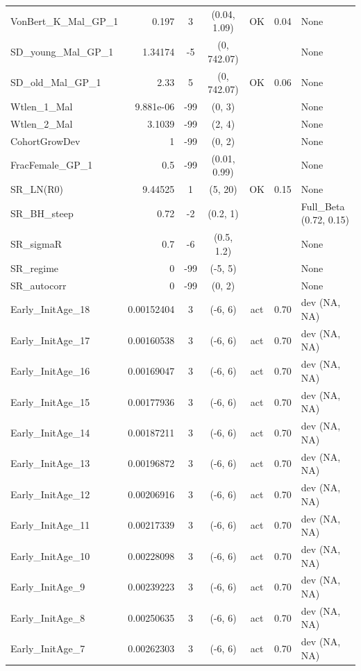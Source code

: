 \documentclass[12pt,]{article}
\begin{document}
\begin{landscape}
\begin{longtable}{lrcccll}
  VonBert\_K\_Mal\_GP\_1 & 0.197 & 3 & (0.04, 1.09) & OK & 0.04 & None \\ 
  SD\_young\_Mal\_GP\_1 & 1.34174 & -5 & (0, 742.07) &  &  & None \\ 
  SD\_old\_Mal\_GP\_1 & 2.33 & 5 & (0, 742.07) & OK & 0.06 & None \\ 
  Wtlen\_1\_Mal & 9.881e-06 & -99 & (0, 3) &  &  & None \\ 
  Wtlen\_2\_Mal & 3.1039 & -99 & (2, 4) &  &  & None \\ 
  CohortGrowDev & 1 & -99 & (0, 2) &  &  & None \\ 
  FracFemale\_GP\_1 & 0.5 & -99 & (0.01, 0.99) &  &  & None \\ 
  SR\_LN(R0) & 9.44525 & 1 & (5, 20) & OK & 0.15 & None \\ 
  SR\_BH\_steep & 0.72 & -2 & (0.2, 1) &  &  & Full\_Beta (0.72, 0.15) \\ 
  SR\_sigmaR & 0.7 & -6 & (0.5, 1.2) &  &  & None \\ 
  SR\_regime & 0 & -99 & (-5, 5) &  &  & None \\ 
  SR\_autocorr & 0 & -99 & (0, 2) &  &  & None \\ 
  Early\_InitAge\_18 & 0.00152404 & 3 & (-6, 6) & act & 0.70 & dev (NA, NA) \\ 
  Early\_InitAge\_17 & 0.00160538 & 3 & (-6, 6) & act & 0.70 & dev (NA, NA) \\ 
  Early\_InitAge\_16 & 0.00169047 & 3 & (-6, 6) & act & 0.70 & dev (NA, NA) \\ 
  Early\_InitAge\_15 & 0.00177936 & 3 & (-6, 6) & act & 0.70 & dev (NA, NA) \\ 
  Early\_InitAge\_14 & 0.00187211 & 3 & (-6, 6) & act & 0.70 & dev (NA, NA) \\ 
  Early\_InitAge\_13 & 0.00196872 & 3 & (-6, 6) & act & 0.70 & dev (NA, NA) \\ 
  Early\_InitAge\_12 & 0.00206916 & 3 & (-6, 6) & act & 0.70 & dev (NA, NA) \\ 
  Early\_InitAge\_11 & 0.00217339 & 3 & (-6, 6) & act & 0.70 & dev (NA, NA) \\ 
  Early\_InitAge\_10 & 0.00228098 & 3 & (-6, 6) & act & 0.70 & dev (NA, NA) \\ 
  Early\_InitAge\_9 & 0.00239223 & 3 & (-6, 6) & act & 0.70 & dev (NA, NA) \\ 
  Early\_InitAge\_8 & 0.00250635 & 3 & (-6, 6) & act & 0.70 & dev (NA, NA) \\ 
  Early\_InitAge\_7 & 0.00262303 & 3 & (-6, 6) & act & 0.70 & dev (NA, NA) \\ 

\end{longtable}
\end{landscape}
\end{document}
